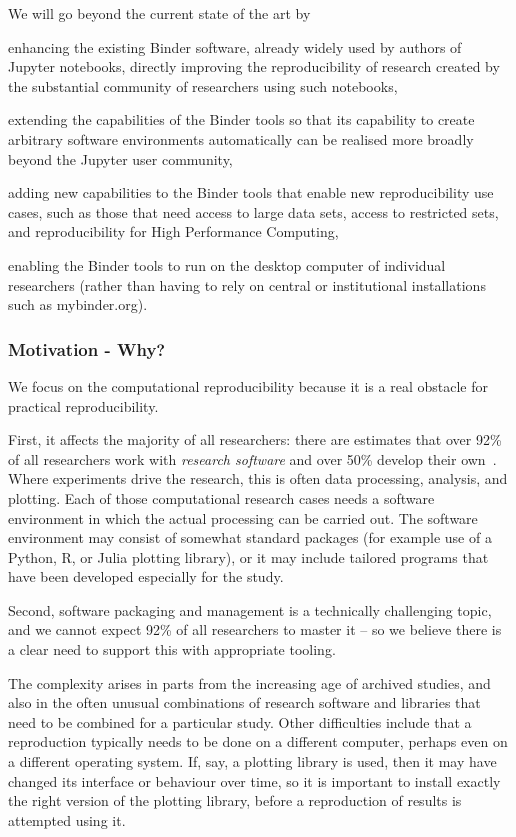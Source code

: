 We will go beyond the current state of the art by
\begin{compactitem}
\item enhancing the existing Binder software, already widely used by authors of Jupyter notebooks,
  directly improving the reproducibility of research created by the substantial
  community of researchers using such notebooks,
\item extending the capabilities of the Binder tools so that its capability to
  create arbitrary software environments automatically can be realised more broadly beyond the
  Jupyter user community,
\item adding new capabilities to the Binder tools that enable new reproducibility
  use cases, such as those that need access to large data sets, access to restricted sets,
  and reproducibility for High Performance Computing,
\item enabling the Binder tools to run on the desktop computer of individual
  researchers (rather than having to rely on central or institutional
  installations such as mybinder.org).
\end{compactitem}

\subsubsection{Motivation - Why?}

We focus on the computational reproducibility because it is a real
obstacle for practical reproducibility.

First, it affects the majority of all researchers: there are estimates that over 92\%
of all researchers work with \emph{research software} and over 50\% develop
their own~\cite{Hettrick2014}. Where experiments drive the research, this is
often data processing, analysis, and plotting. Each of those computational
research cases needs a software environment in which the actual processing can
be carried out. The software environment may consist of somewhat standard packages (for example
use of a Python, R, or Julia plotting library), or it may include tailored
programs that have been developed especially for the study.

Second, software packaging and management is a technically challenging topic,
and we cannot expect 92\% of all researchers to master it -- so we believe there
is a clear need to support this with appropriate tooling.

The complexity arises in parts from the increasing age of archived studies, and
also in the often unusual combinations of research software and libraries that
need to be combined for a particular study. Other difficulties include that a
reproduction typically needs to be done on a different computer, perhaps even on
a different operating system. If, say, a plotting library is used, then it may
have changed its interface or behaviour over time, so it is important to install
exactly the right version of the plotting library, before a reproduction of
results is attempted using it.

